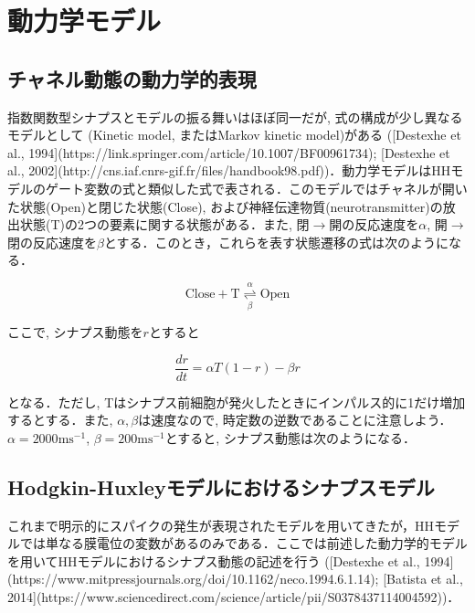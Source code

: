 \section{動力学モデル}
\subsection{チャネル動態の動力学的表現}
指数関数型シナプスとモデルの振る舞いはほぼ同一だが, 式の構成が少し異なるモデルとして\textbf{} (Kinetic model, またはMarkov kinetic model)がある ([Destexhe et al., 1994](https://link.springer.com/article/10.1007/BF00961734); [Destexhe et al., 2002](http://cns.iaf.cnrs-gif.fr/files/handbook98.pdf))．動力学モデルはHHモデルのゲート変数の式と類似した式で表される．このモデルではチャネルが開いた状態(Open)と閉じた状態(Close), および神経伝達物質(neurotransmitter)の放出状態(T)の2つの要素に関する状態がある．また, 閉$\to$開の反応速度を$\alpha$, 開$\to$閉の反応速度を$\beta$とする．このとき，これらを表す状態遷移の式は次のようになる．


\begin{equation}
\text{Close}+\text{T}  \underset{\beta}{\overset{\alpha}{\rightleftharpoons}}\text{Open}    
\end{equation}


ここで, シナプス動態を$r$とすると


\begin{equation}
\frac{dr}{dt}=\alpha T (1-r) - \beta r
\end{equation}


となる．ただし, Tはシナプス前細胞が発火したときにインパルス的に1だけ増加するとする．また, $\alpha, \beta$は速度なので, 時定数の逆数であることに注意しよう． $\alpha=2000 \text{ms}^{-1}$, $\beta=200 \text{ms}^{-1}$とすると, シナプス動態は次のようになる．



\subsection{Hodgkin-Huxleyモデルにおけるシナプスモデル}
これまで明示的にスパイクの発生が表現されたモデルを用いてきたが，HHモデルでは単なる膜電位の変数があるのみである．ここでは前述した動力学的モデルを用いてHHモデルにおけるシナプス動態の記述を行う ([Destexhe et al., 1994](https://www.mitpressjournals.org/doi/10.1162/neco.1994.6.1.14); [Batista et al., 2014](https://www.sciencedirect.com/science/article/pii/S0378437114004592))．

